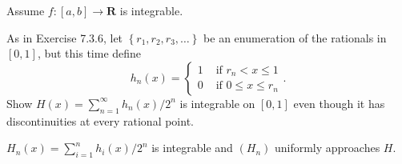 \begin{exercise} Assume $f:[a, b] \rightarrow \mathbf{R}$ is integrable.
\end{exercise}
\begin{solution}
    \TODO
\end{solution}

\begin{exercise} As in Exercise 7.3.6, let $\left\{r_{1}, r_{2}, r_{3}, \ldots\right\}$ be an enumeration of the rationals in $[0,1]$, but this time define
$$
h_{n}(x)=\left\{\begin{array}{ll}
1 & \text { if } r_{n}<x \leq 1 \\
0 & \text { if } 0 \leq x \leq r_{n}
\end{array} .\right.
$$
Show $H(x)=\sum_{n=1}^{\infty} h_{n}(x) / 2^{n}$ is integrable on $[0,1]$ even though it has discontinuities at every rational point.
\end{exercise}
\begin{solution}
\(H_n(x) = \sum^n_{i=1} h_i(x) / 2^n\) is integrable and \((H_n)\) uniformly approaches \(H\).
\end{solution}

